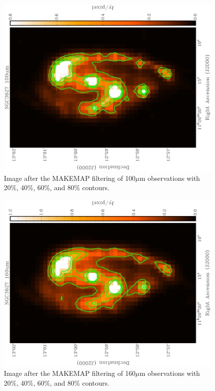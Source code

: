 \begin{figure}
  \centering
  \includegraphics[width=1.\textwidth,angle=270]{obs_imgs/100_um.eps}
  \caption[NGC3627 100$\mu$m Observations]{Image after the MAKEMAP filtering of 100$\mu$m observations with 20\%, 40\%, 60\%, and 80\% contours.}
  \label{fig_100}
\end{figure}

\begin{figure}
  \centering
  \includegraphics[width=1.\textwidth,angle=270]{obs_imgs/160_um.eps}
  \caption[NGC3627 160$\mu$m Observations]{Image after the MAKEMAP filtering of 160$\mu$m observations with 20\%, 40\%, 60\%, and 80\% contours.}
  \label{fig_160}
\end{figure}

